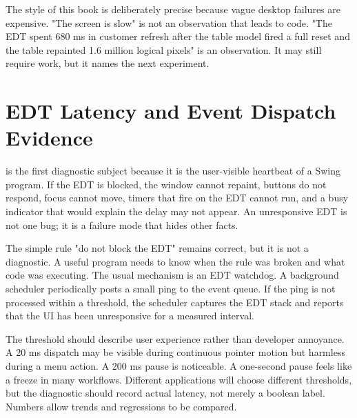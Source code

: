 The style of this book is deliberately precise because vague desktop failures are expensive. "The screen is slow" is not an observation that leads to code. "The EDT spent 680 ms in customer refresh after the table model fired a full reset and the table repainted 1.6 million logical pixels" is an observation. It may still require work, but it names the next experiment.

\section{EDT Latency and Event Dispatch Evidence}

 is the first diagnostic subject because it is the user-visible heartbeat of a Swing program. If the EDT is blocked, the window cannot repaint, buttons do not respond, focus cannot move, timers that fire on the EDT cannot run, and a busy indicator that would explain the delay may not appear. An unresponsive EDT is not one bug; it is a failure mode that hides other facts.

The simple rule "do not block the EDT" remains correct, but it is not a diagnostic. A useful program needs to know when the rule was broken and what code was executing. The usual mechanism is an EDT watchdog. A background scheduler periodically posts a small ping to the event queue. If the ping is not processed within a threshold, the scheduler captures the EDT stack and reports that the UI has been unresponsive for a measured interval.

The threshold should describe user experience rather than developer annoyance. A 20 ms dispatch may be visible during continuous pointer motion but harmless during a menu action. A 200 ms pause is noticeable. A one-second pause feels like a freeze in many workflows. Different applications will choose different thresholds, but the diagnostic should record actual latency, not merely a boolean label. Numbers allow trends and regressions to be compared.

